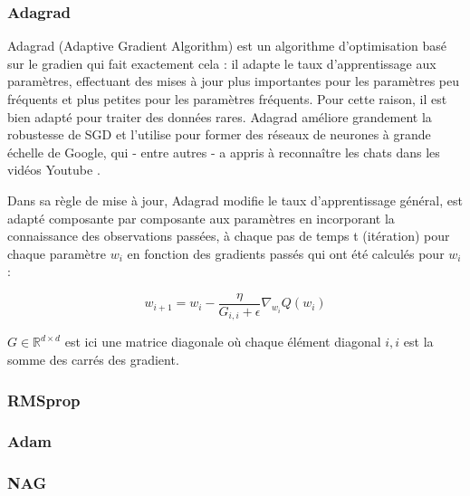 	\lipsum[1]
	\subsubsection{Adagrad}
	Adagrad \cite{lydia2019adagrad} (Adaptive Gradient Algorithm) est un algorithme d'optimisation basé sur le gradien qui fait exactement cela : il adapte le taux d'apprentissage aux paramètres, effectuant des mises à jour plus importantes pour les paramètres peu fréquents et plus petites pour les paramètres fréquents. Pour cette raison, il est bien adapté pour traiter des données rares. Adagrad améliore grandement la robustesse de SGD et l'utilise pour former des réseaux de neurones à grande échelle de Google, qui - entre autres - a appris à reconnaître les chats dans les vidéos Youtube \cite{ruder2016overview}. 
	
	Dans sa règle de mise à jour, Adagrad modifie le taux d'apprentissage général, est adapté composante par composante aux paramètres en incorporant la connaissance des observations passées, à chaque pas de temps t (itération) pour chaque paramètre $w_i$ en fonction des gradients passés qui ont été calculés pour $w_i$ :
	
	\begin{equation*}
		w_{i+1} = w_i - \frac{\eta}{G_{i,i} + \epsilon}\nabla_{w_i} Q(w_i)
	\end{equation*}
	
 	$G \in \mathbb{R}^{d \times d} $ est ici une matrice diagonale où chaque élément diagonal $i,i$ est la somme des carrés des gradient.
	
	
	\subsubsection{RMSprop}
	\lipsum[1]
	
	\subsubsection{Adam}
	
	\cite{kingma2014adam}
	
	
	\lipsum[2]
	\subsubsection{NAG}
	\lipsum[4]
	
	
